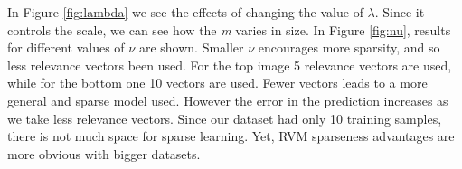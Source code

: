 \documentclass[12pt]{article}
\begin{document}
In Figure \ref{fig:lambda} we see the effects of changing the value of $\lambda$.
Since it controls the scale, we can see how the \emph{m} varies in size.
In Figure \ref{fig:nu}, results for different values of $\nu$ are shown.
Smaller $\nu$ encourages more sparsity, and so less relevance vectors been used.
For the top image 5 relevance vectors are used, while for the bottom one 10 vectors are used.
Fewer vectors leads to a more general and sparse model used. 
However the error in the prediction increases as we take less relevance vectors.
Since our dataset had only 10 training samples, there is not much space for sparse learning.
Yet, RVM sparseness advantages are more obvious with bigger datasets.   

\end{document}
